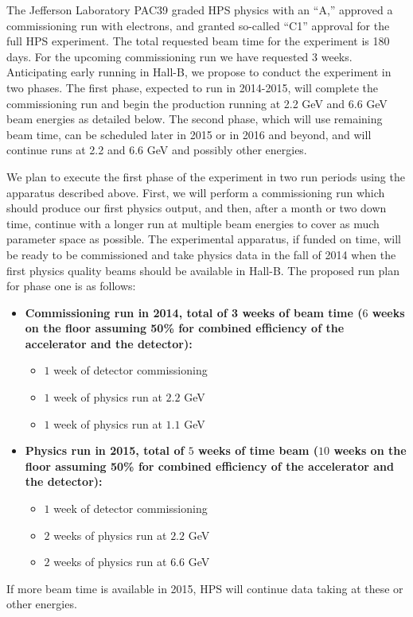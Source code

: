 The Jefferson Laboratory PAC39 graded HPS physics with an ``A,'' approved a commissioning run with electrons, and granted so-called ``C1'' approval 
for the full HPS experiment. The total requested beam time for the experiment is 180 days. For the upcoming commissioning run we have requested 3 weeks. 
Anticipating early running in Hall-B, we propose to conduct the experiment in two phases. The first phase, expected to run 
in 2014-2015, will complete the commissioning run and begin the production running at 2.2 GeV and 
6.6 GeV beam energies as detailed below. The second phase, which will use remaining beam time, can be scheduled later in 2015 or in 2016 and beyond,
and will continue runs at 2.2 and 6.6 GeV and possibly other energies.

We plan to execute the first phase of the experiment in two run periods using the apparatus described above. First, we will perform 
a commissioning run which should produce our first physics output, and then, after a month or two down time, continue with a longer run at multiple beam 
energies to cover as much parameter space as possible. The experimental apparatus, if funded on time, will be ready to be commissioned 
and take physics data in the fall of 2014 when the first physics quality beams should be available in Hall-B. The proposed run plan for phase
one is as follows: 

\begin{itemize}
\item {\bf Commissioning run in 2014, total of 3 weeks of beam time ($6$ weeks on the floor assuming 50\% for combined efficiency of 
the accelerator and the detector):}
\begin{itemize}
\item $1$ week of detector commissioning
\item $1$ week of physics run at $2.2$ GeV
\item $1$ week of physics run at $1.1$ GeV
\end{itemize}
\item{\bf Physics run in 2015, total of $5$ weeks of time beam ($10$ weeks on the floor assuming 50\% for combined efficiency of the 
accelerator and the detector):}
\begin{itemize}
\item $1$ week of detector commissioning
\item $2$ weeks of physics run at $2.2$ GeV
\item $2$ weeks of physics run at $6.6$ GeV
\end{itemize}
\end{itemize}
If more beam time is available in 2015, HPS will continue data taking at these or other energies.

